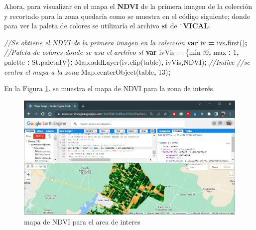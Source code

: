 \documentclass[
]{book}
\newenvironment{Shaded}{\begin{snugshade}}{\end{snugshade}}
\newcommand{\AttributeTok}[1]{\textcolor[rgb]{0.77,0.63,0.00}{#1}}
\newcommand{\BuiltInTok}[1]{#1}
\newcommand{\CommentTok}[1]{\textcolor[rgb]{0.56,0.35,0.01}{\textit{#1}}}
\newcommand{\DataTypeTok}[1]{\textcolor[rgb]{0.13,0.29,0.53}{#1}}
\newcommand{\DecValTok}[1]{\textcolor[rgb]{0.00,0.00,0.81}{#1}}
\newcommand{\FunctionTok}[1]{\textcolor[rgb]{0.00,0.00,0.00}{#1}}
\newcommand{\KeywordTok}[1]{\textcolor[rgb]{0.13,0.29,0.53}{\textbf{#1}}}
\newcommand{\NormalTok}[1]{#1}
\newcommand{\OperatorTok}[1]{\textcolor[rgb]{0.81,0.36,0.00}{\textbf{#1}}}
\newcommand{\StringTok}[1]{\textcolor[rgb]{0.31,0.60,0.02}{#1}}
\begin{document}
Ahora, para visualizar en el mapa el \textbf{NDVI} de la primera imagen de la colección y recortado para la zona quedaría como se muestra en el código siguiente; donde para ver la paleta de colores se utilizaría el archivo \textbf{st } de ¨\textbf{VICAL}.

\begin{Shaded}
\begin{Highlighting}[]
\CommentTok{//Se obtiene el NDVI de la primera imagen en la coleccion }
\KeywordTok{var}\NormalTok{ iv }\OperatorTok{=}\NormalTok{ ivs}\OperatorTok{.}\FunctionTok{first}\NormalTok{()}\OperatorTok{;}
\CommentTok{//Paleta de colores donde se usa el archivo st}
\KeywordTok{var}\NormalTok{ ivVis }\OperatorTok{=}\NormalTok{ \{}\DataTypeTok{min} \OperatorTok{:}\DecValTok{0}\OperatorTok{,} \DataTypeTok{max} \OperatorTok{:} \DecValTok{1}\OperatorTok{,} \DataTypeTok{palette} \OperatorTok{:}\NormalTok{ St}\OperatorTok{.}\AttributeTok{paletaIV}\NormalTok{\}}\OperatorTok{;}
\BuiltInTok{Map}\OperatorTok{.}\FunctionTok{addLayer}\NormalTok{(iv}\OperatorTok{.}\FunctionTok{clip}\NormalTok{(table)}\OperatorTok{,}\NormalTok{ ivVis}\OperatorTok{,}\StringTok{\textquotesingle{}NDVI\textquotesingle{}}\NormalTok{)}\OperatorTok{;} \CommentTok{//Indice}
\CommentTok{//se centra el mapa a la zona}
 \BuiltInTok{Map}\OperatorTok{.}\FunctionTok{centerObject}\NormalTok{(table}\OperatorTok{,} \DecValTok{13}\NormalTok{)}\OperatorTok{;}
\end{Highlighting}
\end{Shaded}

En la Figura \ref{fig:figV6}. se muestra el mapa de NDVI para la zona de interés.

\begin{figure}

{\centering \includegraphics[width=0.85\linewidth]{./images/Figure74} 

}

\caption{mapa de NDVI para el area de interes}\label{fig:figV6}
\end{figure}
\end{document}
